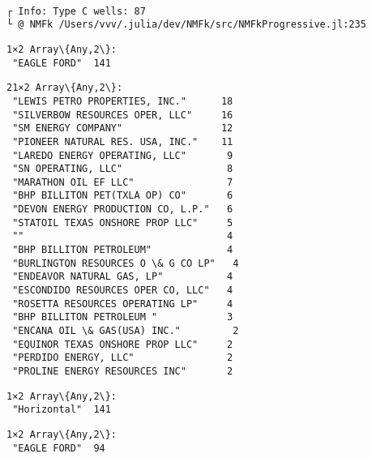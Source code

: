 \documentclass[11pt]{article}
\begin{document}
    \begin{center}
    \end{center}
    { \hspace*{\fill} \\}
    
    \begin{Verbatim}[commandchars=\\\{\}]
┌ Info: Type C wells: 87
└ @ NMFk /Users/vvv/.julia/dev/NMFk/src/NMFkProgressive.jl:235
    \end{Verbatim}

    
    \begin{Verbatim}[commandchars=\\\{\}]
1×2 Array\{Any,2\}:
 "EAGLE FORD"  141
    \end{Verbatim}

    
    
    \begin{Verbatim}[commandchars=\\\{\}]
21×2 Array\{Any,2\}:
 "LEWIS PETRO PROPERTIES, INC."      18
 "SILVERBOW RESOURCES OPER, LLC"     16
 "SM ENERGY COMPANY"                 12
 "PIONEER NATURAL RES. USA, INC."    11
 "LAREDO ENERGY OPERATING, LLC"       9
 "SN OPERATING, LLC"                  8
 "MARATHON OIL EF LLC"                7
 "BHP BILLITON PET(TXLA OP) CO"       6
 "DEVON ENERGY PRODUCTION CO, L.P."   6
 "STATOIL TEXAS ONSHORE PROP LLC"     5
 ""                                   4
 "BHP BILLITON PETROLEUM"             4
 "BURLINGTON RESOURCES O \& G CO LP"   4
 "ENDEAVOR NATURAL GAS, LP"           4
 "ESCONDIDO RESOURCES OPER CO, LLC"   4
 "ROSETTA RESOURCES OPERATING LP"     4
 "BHP BILLITON PETROLEUM "            3
 "ENCANA OIL \& GAS(USA) INC."         2
 "EQUINOR TEXAS ONSHORE PROP LLC"     2
 "PERDIDO ENERGY, LLC"                2
 "PROLINE ENERGY RESOURCES INC"       2
    \end{Verbatim}

    
    
    \begin{Verbatim}[commandchars=\\\{\}]
1×2 Array\{Any,2\}:
 "Horizontal"  141
    \end{Verbatim}

    
    
    \begin{Verbatim}[commandchars=\\\{\}]
1×2 Array\{Any,2\}:
 "EAGLE FORD"  94
    \end{Verbatim}
\end{document}
